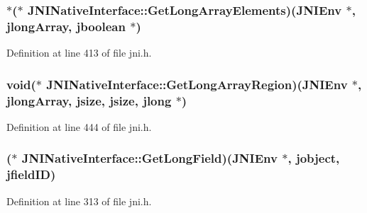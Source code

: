 \hypertarget{struct_j_n_i_native_interface_ab67021e81374feb444acc09425865ba0}{
\subsubsection[{Get\-Long\-Array\-Elements}]{$\ast$($\ast$ J\-N\-I\-Native\-Interface\-::\-Get\-Long\-Array\-Elements)({\bf J\-N\-I\-Env} $\ast$, {\bf jlong\-Array}, {\bf jboolean} $\ast$)}}\label{struct_j_n_i_native_interface_ab67021e81374feb444acc09425865ba0}


Definition at line 413 of file jni.\-h.

\hypertarget{struct_j_n_i_native_interface_a926deb0c186bea5064746f78d0fb4039}{
\subsubsection[{Get\-Long\-Array\-Region}]{\setlength{\rightskip}{0pt plus 5cm}void($\ast$ J\-N\-I\-Native\-Interface\-::\-Get\-Long\-Array\-Region)({\bf J\-N\-I\-Env} $\ast$, {\bf jlong\-Array}, {\bf jsize}, {\bf jsize}, {\bf jlong} $\ast$)}}\label{struct_j_n_i_native_interface_a926deb0c186bea5064746f78d0fb4039}


Definition at line 444 of file jni.\-h.

\hypertarget{struct_j_n_i_native_interface_a5a4a57d5ee8a78dbc7868cde3d52917c}{
\subsubsection[{Get\-Long\-Field}]{($\ast$ J\-N\-I\-Native\-Interface\-::\-Get\-Long\-Field)({\bf J\-N\-I\-Env} $\ast$, {\bf jobject}, {\bf jfield\-I\-D})}}\label{struct_j_n_i_native_interface_a5a4a57d5ee8a78dbc7868cde3d52917c}


Definition at line 313 of file jni.\-h.

